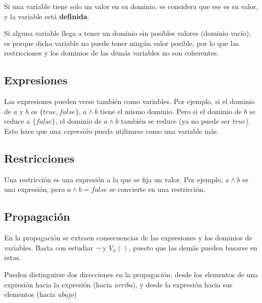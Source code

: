 \documentclass[11pt]{article}
\begin{document}
Si una variable tiene solo un valor en su dominio, se considera que ese es su valor, y la variable está \textbf{definida}.

Si alguna variable llega a tener un dominio sin posibles valores (dominio vacío), es porque dicha variable no puede tener ningún valor posible, por lo que las restricciones y los dominios de las demás variables no son coherentes.

\subsection*{Expresiones}
\label{sec:orgbce83ed}
Las expresiones pueden verse también como variables. Por ejemplo, si el dominio de \(a\) y \(b\) es \(\{true,false\}\), \(a \land b\) tiene el mismo dominio. Pero si el dominio de \(b\) se reduce a \(\{false\}\), el dominio de \(a \land b\) también se reduce (ya no puede ser \(true\)). Esto hace que una \emph{expresión} pueda utilizarse como una variable más.

\subsection*{Restricciones}
\label{sec:org82d7426}
Una restricción es una expresión a la que se fija un valor. Por ejemplo, \(a \land b\) es una expresión, pero \(a \land b = false\) se convierte en una restricción.


\subsection*{Propagación}
\label{sec:org9c4e729}
En la propagación se extraen consecuencias de las expresiones y los dominios de variables. Basta con estudiar \(\lnot\) y \(V_n()\), puesto que las demás pueden basarse en estas.

Pueden distinguirse dos direcciones en la propagación: desde los elementos de una expresión hacia la expresión (hacia \emph{arriba}), y desde la expresión hacia sus elementos (hacia \emph{abajo})
\end{document}
